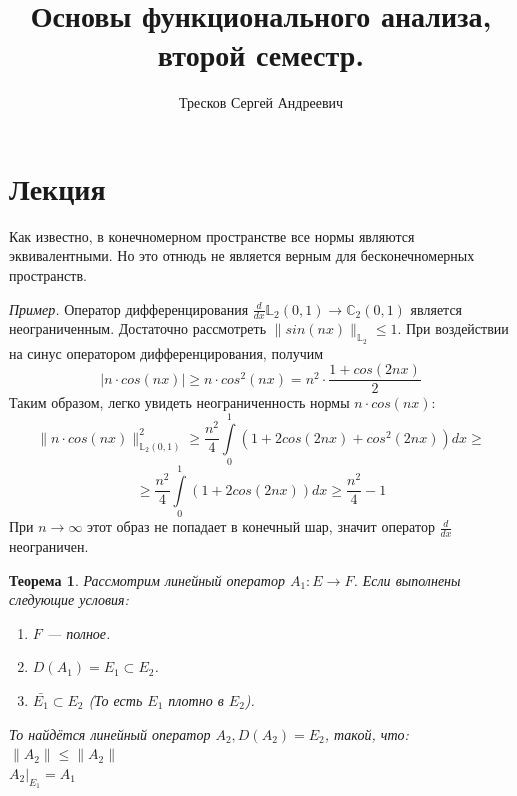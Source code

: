 \documentclass[12pt]{article}
\newcommand{\example}{{\itshape Пример. }}
\newcommand{\norm}[1]{\| #1 \|}
\newcommand{\Int}[2]{\underset{#1}{\overset{#2}{\int}}}
\renewcommand{\leq}{\leqslant}
\renewcommand{\geq}{\geqslant}
\newtheorem{theorem}{Теорема}[section] %
\begin{document}
	\title{Основы функционального анализа, второй семестр.}
	\author{Тресков Сергей Андреевич}
	\maketitle
	
	\section{Лекция}
	
	Как известно, в конечномерном пространстве все нормы являются эквивалентными. Но это отнюдь не является верным для бесконечномерных
	пространств.
	
	\example Оператор дифференцирования $\frac{d}{dx} \mathbb{L}_2(0, 1) \rightarrow \mathbb{C}_2(0, 1)$ является неограниченным. 
	Достаточно рассмотреть $\norm{sin(nx)}_{\mathbb{L}_2} \leq 1$. При воздействии на синус оператором дифференцирования, получим
	$$|n \cdot cos(nx)| \geq n \cdot cos^2(nx) = n^2 \cdot \frac{1 + cos(2nx)}{2}$$
	Таким образом, легко увидеть неограниченность нормы $n \cdot cos(nx)$:
	$$\norm{n \cdot cos(nx)}_{\mathbb{L}_2(0,1)}^2 \geq \frac{n^2}{4} \Int{0}{1} (1 + 2 cos(2nx) + cos^2(2nx)) dx \geq$$
	$$\geq \frac{n^2}{4} \Int{0}{1} (1 + 2 cos(2nx)) dx \geq \frac{n^2}{4} - 1$$
	При $n \rightarrow \infty$ этот образ не попадает в конечный шар, значит оператор $\frac{d}{dx}$ неограничен.
	
	
	\begin{theorem}
		Рассмотрим линейный оператор $A_1 : E \rightarrow F$. Если выполнены следующие условия:
		\begin{enumerate}
			\item $F$ --- полное.
			\item $D(A_1) = E_1 \subset E_2$.
			\item $\bar{E_1} \subset E_2$ (То есть $E_1$ плотно в $E_2$).
		\end{enumerate}
		То найдётся линейный оператор $A_2, D(A_2) = E_2$, такой, что: \\
		$\norm{A_2} \leq \norm{A_2}$ \\
		$A_2 |_{E_1} = A_1$
	\end{theorem}
	
\end{document}
